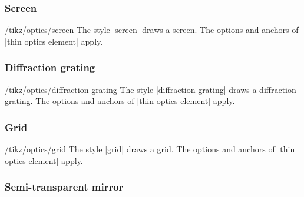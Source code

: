 \documentclass[a4paper]{ltxdoc}
\begin{document}
\subsubsection{Screen}


\begin{stylekey}{/tikz/optics/screen}
The style |screen| draws a screen.
The options and anchors of |thin optics element| apply.

\begin{codeexample}[width=6cm]
\end{codeexample}
\end{stylekey}

\subsubsection{Diffraction grating}

\begin{stylekey}{/tikz/optics/diffraction grating}
The style |diffraction grating| draws a diffraction grating.
The options and anchors of |thin optics element| apply.

\begin{codeexample}[width=6cm]
\end{codeexample}
\end{stylekey}

\subsubsection{Grid}

\begin{stylekey}{/tikz/optics/grid}
The style |grid| draws a grid.
The options and anchors of |thin optics element| apply.

\begin{codeexample}[width=6cm]
\end{codeexample}
\end{stylekey}

\subsubsection{Semi-transparent mirror}
\end{document}
